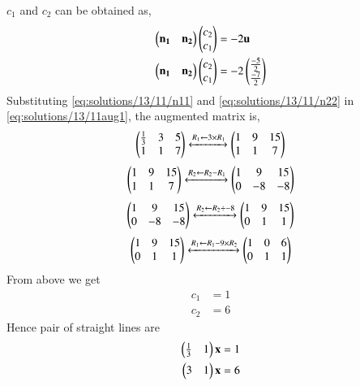 $c_1$ and $c_2$ can be obtained as,
\begin{align}
\begin{pmatrix}\mathbf{n_1} & \mathbf{n_2}\end{pmatrix}\begin{pmatrix}c_2\\c_1\end{pmatrix}&=-2\mathbf{u}\\
\begin{pmatrix}\mathbf{n_1} & \mathbf{n_2}\end{pmatrix}\begin{pmatrix}c_2\\c_1\end{pmatrix}&=-2\begin{pmatrix}\frac{-5}{2}\\\frac{-7}{2}\end{pmatrix}
\label{eq:solutions/13/11aug1}
\end{align}
Substituting \eqref{eq:solutions/13/11/n11} and \eqref{eq:solutions/13/11/n22} in \eqref{eq:solutions/13/11aug1}, the augmented matrix is,
\begin{align}
\begin{pmatrix}\frac{1}{3} & 3& 5 \\ 1 & 1 & 7\end{pmatrix}
\xleftrightarrow[]{R_1 \leftarrow 3\times R_1}
\begin{pmatrix}1 & 9&15\\ 1 & 1 & 7\end{pmatrix}
\end{align}
\begin{align}
\begin{pmatrix}1 & 9&15\\ 1 & 1 & 7\end{pmatrix}
\xleftrightarrow[]{R_2 \leftarrow R_2- R_1}
\begin{pmatrix}1 & 9&15\\ 0 & -8 & -8\end{pmatrix}
\end{align}
\begin{align}
\begin{pmatrix}1 & 9&15\\ 0 & -8 & -8\end{pmatrix}
\xleftrightarrow[]{R_2 \leftarrow R_2\div -8}
\begin{pmatrix}1 & 9&15\\ 0 & 1 & 1\end{pmatrix}
\end{align}
\begin{align}
\begin{pmatrix}1 & 9&15\\ 0 & 1 & 1\end{pmatrix}
\xleftrightarrow[]{R_1 \leftarrow R_1-9\times R_2}
\begin{pmatrix}1 & 0&6\\ 0 & 1&1 \end{pmatrix}
\end{align}
From above  we get 
\begin{align}
    c_1&=1\\
    c_2&=6
\end{align}
Hence pair of straight lines  are
\begin{align}
    \begin{pmatrix}\frac{1}{3}& 1\end{pmatrix}\mathbf{x}&=1\\
    \begin{pmatrix}3 & 1\end{pmatrix}\mathbf{x}&=6
\end{align}

   
